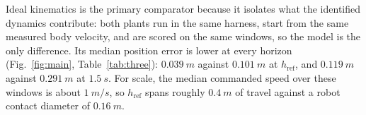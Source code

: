 %
%
%
%
%
\label{sec:results:rsim}

Ideal kinematics is the primary comparator because it isolates what the
identified dynamics contribute: both plants run in the same harness, start from
the same measured body velocity, and are scored on the same windows, so the
model is the only difference. Its median position error is lower at every
horizon (Fig.~\ref{fig:main}, Table~\ref{tab:three}): $\SI{0.039}{m}$ against
$\SI{0.101}{m}$ at $h_{\mathrm{ref}}$, and $\SI{0.119}{m}$ against
$\SI{0.291}{m}$ at $\SI{1.5}{s}$. For scale, the median commanded speed over
these windows is about $\SI{1}{m/s}$, so $h_{\mathrm{ref}}$ spans roughly
$\SI{0.4}{m}$ of travel against a robot contact diameter of $\SI{0.16}{m}$.

